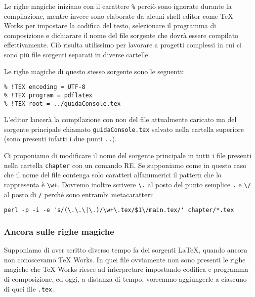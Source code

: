 Le righe magiche iniziano con il carattere \texttt{\%} perciò sono ignorate durante la compilazione, mentre invece sono elaborate da alcuni shell editor come TeX Works per impostare la codifica del testo, selezionare il programma di composizione e dichiarare il nome del file sorgente che dovrà essere compilato effettivamente. Ciò risulta utilissimo per lavorare a progetti complessi in cui ci sono più file sorgenti separati in diverse cartelle.

Le righe magiche di questo stesso sorgente sono le seguenti:
\begin{verbatim}
% !TEX encoding = UTF-8
% !TEX program = pdflatex
% !TEX root = ../guidaConsole.tex
\end{verbatim}
L'editor lancerà la compilazione con  non del file attualmente caricato ma del sorgente principale chiamato \texttt{guidaConsole.tex} salvato nella cartella superiore (sono presenti infatti i due punti \texttt{..}).

Ci proponiamo di modificare il nome del sorgente principale in tutti i file presenti nella cartella \texttt{chapter} con un comando RE. Se supponiamo come in questo caso che il nome del file contenga solo caratteri alfanumerici il pattern che lo rappresenta è \texttt{\textbackslash w+}. Dovremo inoltre scrivere \texttt{\textbackslash .} al posto del punto semplice \texttt{.} e \texttt{\textbackslash /} al posto di \texttt{/} perché sono entrambi metacaratteri: 
\begin{Verbatim}[fontsize=\small]
perl -p -i -e 's/(\.\.\|\.)/\w+\.tex/$1\/main.tex/' chapter/*.tex
\end{Verbatim}

\subsubsection{Ancora sulle righe magiche}
\label{sssec:addheader}

Supponiamo di aver scritto diverso tempo fa dei sorgenti \LaTeX, quando ancora non conoscevamo TeX Works. In quei file ovviamente non sono
presenti le righe magiche che TeX Works riesce ad
interpretare impostando codifica e programma di composizione, ed oggi, a distanza di tempo, vorremmo aggiungerle a ciascuno di quei file \texttt{.tex}.

